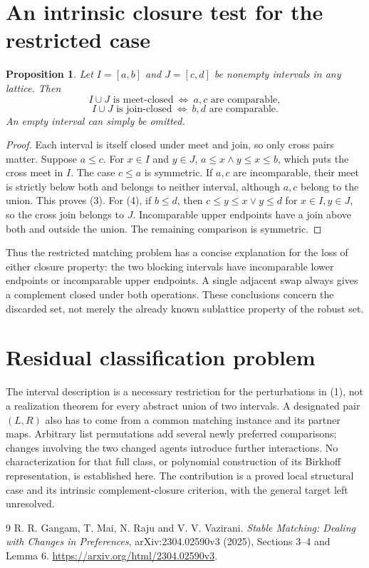 \documentclass[11pt]{article}
\newtheorem{proposition}[theorem]{Proposition}
\theoremstyle{definition}
\begin{document}
\section*{An intrinsic closure test for the restricted case}
\begin{proposition}
Let $I=[a,b]$ and $J=[c,d]$ be nonempty intervals in any lattice. Then
\[
 I\cup J\text{ is meet-closed}\ \Longleftrightarrow\ a,c
       \text{ are comparable},                           \tag{3}
\]
\[
 I\cup J\text{ is join-closed}\ \Longleftrightarrow\ b,d
       \text{ are comparable}.                           \tag{4}
\]
An empty interval can simply be omitted.
\end{proposition}
\begin{proof}
Each interval is itself closed under meet and join, so only cross pairs
matter. Suppose $a\le c$. For $x\in I$ and $y\in J$,
$a\le x\wedge y\le x\le b$, which puts the cross meet in $I$.
The case $c\le a$ is symmetric. If $a,c$ are incomparable, their meet
is strictly below both and belongs to neither interval, although $a,c$
belong to the union. This proves (3).
For (4), if $b\le d$, then $c\le y\le x\vee y\le d$ for
$x\in I,y\in J$, so the cross join belongs to $J$.
Incomparable upper endpoints have a join above both and outside the union.
The remaining comparison is symmetric.
\end{proof}

Thus the restricted matching problem has a concise explanation for the
loss of either closure property: the two blocking intervals have
incomparable lower endpoints or incomparable upper endpoints. A single
adjacent swap always gives a complement closed under both operations.
These conclusions concern the discarded set, not merely the already
known sublattice property of the robust set.

\section*{Residual classification problem}
The interval description is a necessary restriction for the perturbations
in (1), not a realization theorem for every abstract union of two
intervals. A designated pair $(L,R)$ also has to come from a common
matching instance and its partner maps. Arbitrary list permutations add
several newly preferred comparisons; changes involving the two changed
agents introduce further interactions. No characterization for that full
class, or polynomial construction of its Birkhoff representation, is
established here. The contribution is a proved local structural case and
its intrinsic complement-closure criterion, with the general target left
unresolved.

\begin{thebibliography}{9}
 R. R. Gangam, T. Mai, N. Raju and V. V. Vazirani.
\emph{Stable Matching: Dealing with Changes in Preferences},
arXiv:2304.02590v3 (2025), Sections 3--4 and Lemma 6.
\url{https://arxiv.org/html/2304.02590v3}.
\end{thebibliography}
\end{document}
